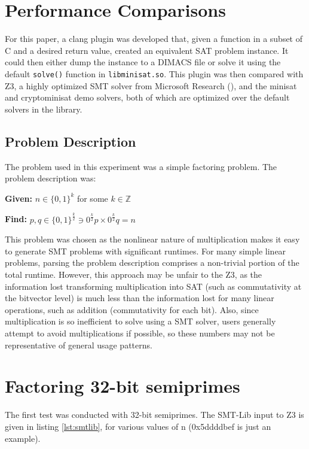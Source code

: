 \documentclass{sig-alternate}
\begin{document}
\section{Performance Comparisons}

For this paper, a clang plugin was developed that, given a function in
a subset of C and a desired return value, created an equivalent SAT
problem instance.  It could then either dump the instance to a DIMACS
file or solve it using the default \texttt{solve()} function in
\texttt{libminisat.so}.  This plugin was then compared with Z3, a
highly optimized SMT solver from Microsoft Research (\cite{demoura}),
and the minisat and cryptominisat demo solvers, both of which are
optimized over the default solvers in the library.

\subsection{Problem Description}

The problem used in this experiment was a simple factoring problem.
The problem description was:

\medskip

\noindent \hangindent=0.7cm \textbf{Given:} $n \in \{ 0, 1 \}^k$
for some $k \in \mathbb{Z}$

\noindent \hangindent=0.7cm \textbf{Find:} $p, q \in \{ 0, 1 \}
^{\frac k 2} \ni 0^{\frac k 2}p \times 0^{\frac k 2}q = n$

\medskip

This problem was chosen as the nonlinear nature of multiplication
makes it easy to generate SMT problems with significant runtimes.
For many simple linear problems, parsing the problem description
comprises a non-trivial portion of the total runtime.  However,
this approach may be unfair to the Z3, as the information lost
transforming multiplication into SAT (such as commutativity at
the bitvector level) is much less than the information lost for
many linear operations, such as addition (commutativity for each
bit). Also, since multiplication is so inefficient to solve using
a SMT solver, users generally attempt to avoid multiplications if
possible, so these numbers may not be representative of general
usage patterns.

\section{Factoring 32-bit semiprimes}

The first test was conducted with 32-bit semiprimes.  The SMT-Lib
input to Z3 is given in listing \ref{lst:smtlib}, for various values of
n (0x5ddddbef is just an example).
\end{document}
